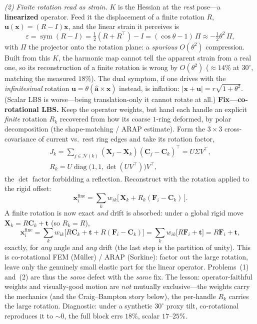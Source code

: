 \emph{(2) Finite rotation read as strain.}
$K$ is the Hessian at the \emph{rest} pose---a \textbf{linearized} operator.
Feed it the displacement of a finite rotation $R$, $\mathbf u(\mathbf x)=(R-I)\mathbf x$, and the linear strain it perceives is
\begin{equation}
  \varepsilon=\operatorname{sym}(R-I)=\tfrac12(R+R^\top)-I=(\cos\theta-1)\,\Pi
  \approx-\tfrac12\theta^2\,\Pi,
\end{equation}
with $\Pi$ the projector onto the rotation plane: a \emph{spurious} $O(\theta^2)$ compression.
Built from this $K$, the harmonic map cannot tell the apparent strain from a real one, so its reconstruction of a finite rotation is wrong by $O(\theta^2)$ ($\approx14\%$ at $30^\circ$, matching the measured $18\%$).
The dual symptom, if one drives with the \emph{infinitesimal} rotation $\mathbf u=\theta(\hat{\mathbf a}\times\mathbf x)$ instead, is inflation: $\lvert\mathbf x+\mathbf u\rvert=r\sqrt{1+\theta^2}$.
(Scalar LBS is worse---being translation-only it cannot rotate at all.)
\textbf{Fix---co-rotational LBS.}
Keep the operator weights, but hand each handle an explicit \emph{finite} rotation $R_k$ recovered from how its coarse $1$-ring deformed, by polar decomposition (the shape-matching / ARAP estimate).
Form the $3\times3$ cross-covariance of current vs.\ rest ring edges and take its rotation factor,
\begin{align*}
  J_k=\sum_{j\in\mathcal N(k)}(\mathbf X_j-\mathbf X_k)(\mathbf C_j-\mathbf C_k)^\top
      =U\Sigma V^\top, \\
  R_k=U\operatorname{diag}\!\big(1,1,\det(UV^\top)\big)V^\top,
\end{align*}
the $\det$ factor forbidding a reflection.
Reconstruct with the rotation applied to the rigid offset:
\begin{equation}
  \mathbf x_i^{\text{fine}}=\sum_k w_{ik}\big[\,\mathbf X_k+R_k(\mathbf F_i-\mathbf C_k)\,\big].
\end{equation}
A finite rotation is now exact \emph{and} drift is absorbed: under a global rigid move $\mathbf X_k=R\mathbf C_k+\mathbf t$ (so $R_k=R$),
\begin{equation}
  \mathbf x_i^{\text{fine}}
   =\sum_k w_{ik}\big[R\mathbf C_k+\mathbf t+R(\mathbf F_i-\mathbf C_k)\big]
   =\sum_k w_{ik}\big[R\mathbf F_i+\mathbf t\big]=R\mathbf F_i+\mathbf t,
\end{equation}
exactly, for \emph{any} angle and \emph{any} drift (the last step is the partition of unity).
This is co-rotational FEM (M\"uller) / ARAP (Sorkine): factor out the large rotation, leave only the genuinely small elastic part for the linear operator.
Problems~(1) and~(2) are thus the \emph{same} defect with the \emph{same} fix.
The lesson: operator-faithful weights and visually-good motion are \emph{not} mutually exclusive---the weights carry the mechanics (and the Craig--Bampton story below), the per-handle $R_k$ carries the large rotation.
Diagnostic: under a synthetic $30^\circ$ proxy tilt, co-rotational reproduces it to ${\sim}0$, the full block errs $18\%$, scalar $17$--$25\%$.

